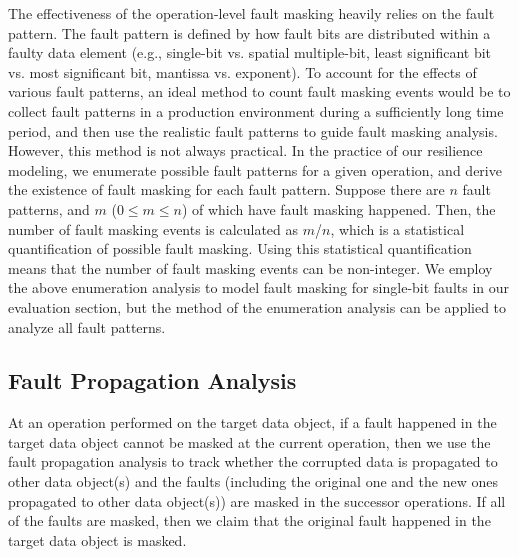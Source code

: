 The effectiveness of the operation-level fault masking heavily relies on the fault pattern.
The fault pattern is defined by how fault bits are distributed within
a faulty data element (e.g., single-bit vs. spatial multiple-bit, least significant bit vs. most significant bit, mantissa vs. exponent).
To account for the effects of various fault patterns, an ideal method to count fault masking events %
would be to collect fault patterns in a production environment during a sufficiently long time period, and then use the realistic fault patterns to guide fault masking analysis. 
However, this method is not always practical. 
In the practice of our resilience modeling, we enumerate possible fault patterns for a given operation, %
and derive the existence of fault masking for each fault pattern.
Suppose there are $n$ fault patterns, and $m$ ($0 \leq m \leq n$) of which have fault masking happened.
Then, the number of fault masking events is calculated as $m$/$n$,
which is a statistical quantification of possible fault masking.
Using this statistical quantification means that the number of fault masking events can be non-integer. 
We employ the above enumeration analysis to model fault masking for single-bit faults in our evaluation section, but the method of the enumeration analysis can be applied to analyze all fault patterns.
\vspace{-10pt}

\subsection{Fault Propagation Analysis}
\label{sec:fault_propagation_analysis}
At an operation performed on the target data object, 
if a fault happened in the target data object cannot be masked at the current operation, 
then we use the fault propagation analysis to track whether the corrupted data
is propagated to other data object(s) and the faults (including the original one and the new ones propagated to other data object(s)) 
are masked in the successor operations.
If all of the faults are masked, then we claim that the original fault happened in the target data object is masked.   

